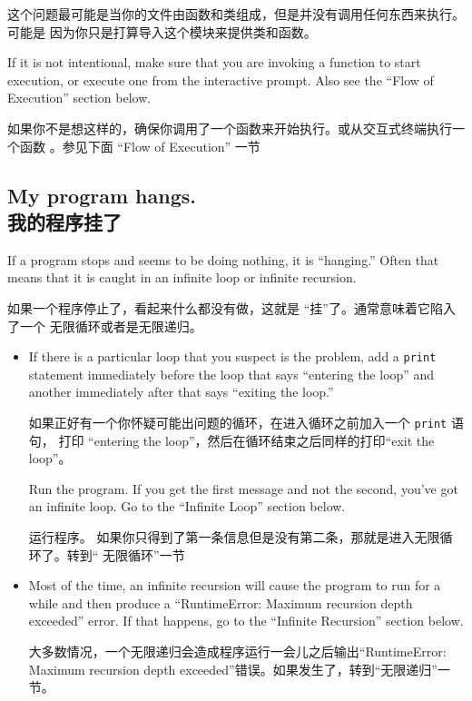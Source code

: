 \documentclass[10pt]{book}
\begin{document}
\begin{CJK}{UTF8}{gbsn}
这个问题最可能是当你的文件由函数和类组成，但是并没有调用任何东西来执行。可能是
因为你只是打算导入这个模块来提供类和函数。

If it is not intentional, make sure that you
are invoking a function to start execution, or execute one from
the interactive prompt.  Also see the ``Flow of Execution'' section
below.

如果你不是想这样的，确保你调用了一个函数来开始执行。或从交互式终端执行一个函数
。参见下面 ``Flow of Execution'' 一节

\subsection{My program hangs. \\ 我的程序挂了}

If a program stops and seems to be doing nothing, it is ``hanging.''
Often that means that it is caught in an infinite loop or infinite
recursion.

如果一个程序停止了，看起来什么都没有做，这就是 ``挂''了。通常意味着它陷入了一个
无限循环或者是无限递归。

\begin{itemize}

\item If there is a particular loop that you suspect is the
problem, add a {\tt print} statement immediately before the loop that says
``entering the loop'' and another immediately after that says
``exiting the loop.''

如果正好有一个你怀疑可能出问题的循环，在进入循环之前加入一个 {\tt print} 语句，
打印 ``entering the loop''，然后在循环结束之后同样的打印``exit the loop''。

Run the program.  If you get the first message and not the second,
you've got an infinite loop.  Go to the ``Infinite Loop'' section
below.

运行程序。 如果你只得到了第一条信息但是没有第二条，那就是进入无限循环了。转到``
无限循环''一节

\item Most of the time, an infinite recursion will cause the program
to run for a while and then produce a ``RuntimeError: Maximum
recursion depth exceeded'' error.  If that happens, go to the
``Infinite Recursion'' section below.

大多数情况，一个无限递归会造成程序运行一会儿之后输出``RuntimeError: Maximum
recursion depth exceeded''错误。如果发生了，转到``无限递归''一节。


\end{itemize}
\end{CJK}
\end{document}
